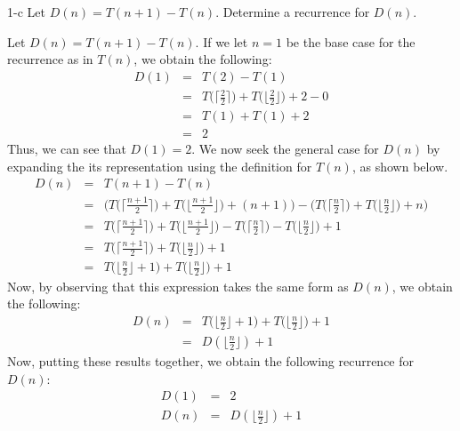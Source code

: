 \documentclass[11pt]{article}
\begin{document}
\begin{prob}{1-c}
Let $D(n) = T(n+1) - T(n)$. Determine a recurrence for $D(n)$.
\end{prob}
\begin{sol}

Let $D(n) = T(n+1) - T(n)$. If we let $n = 1$ be the base case for the recurrence as in $T(n)$, we obtain the following:
\begin{eqnarray*}
D(1) & = & T(2) - T(1) \\
& = &  T\Big(\Big\lceil\frac{2}{2}\Big\rceil\Big) + T\Big(\Big\lfloor\frac{2}{2}\Big\rfloor\Big) + 2 - 0 \\
& = & T(1) + T(1) + 2 \\
& = & 2
\end{eqnarray*}
Thus, we can see that $D(1) = 2$. We now seek the general case for $D(n)$ by expanding the its representation using the definition for $T(n)$, as shown below.
\begin{eqnarray*}
D(n) & = & T(n+1) - T(n) \\
& = & \Bigg(T\Big(\Big\lceil\frac{n+1}{2}\Big\rceil\Big) + T\Big(\Big\lfloor\frac{n+1}{2}\Big\rfloor\Big) + (n+1)\Bigg) - \Bigg(T\Big(\Big\lceil\frac{n}{2}\Big\rceil\Big) + T\Big(\Big\lfloor\frac{n}{2}\Big\rfloor\Big) + n\Bigg) \\
& = & T\Big(\Big\lceil\frac{n+1}{2}\Big\rceil\Big) + T\Big(\Big\lfloor\frac{n+1}{2}\Big\rfloor\Big) - T\Big(\Big\lceil\frac{n}{2}\Big\rceil\Big) - T\Big(\Big\lfloor\frac{n}{2}\Big\rfloor\Big) + 1 \\
& = & T\Big(\Big\lceil\frac{n+1}{2}\Big\rceil\Big) + T\Big(\Big\lfloor\frac{n}{2}\Big\rfloor\Big) + 1 \\
& = & T\Big(\Big\lfloor\frac{n}{2}\Big\rfloor + 1\Big) + T\Big(\Big\lfloor\frac{n}{2}\Big\rfloor\Big) + 1
\end{eqnarray*}
Now, by observing that this expression takes the same form as $D(n)$, we obtain the following:
\begin{eqnarray*}
D(n) & = & T\Big(\Big\lfloor\frac{n}{2}\Big\rfloor + 1\Big) + T\Big(\Big\lfloor\frac{n}{2}\Big\rfloor\Big) + 1 \\
& = & D(\Big\lfloor\frac{n}{2}\Big\rfloor) + 1
\end{eqnarray*}
Now, putting these results together, we obtain the following recurrence for $D(n)$:
\begin{eqnarray*}
D(1) & = & 2 \\
D(n) & = & D(\Big\lfloor\frac{n}{2}\Big\rfloor) + 1
\end{eqnarray*}
\end{sol}
\end{document}
